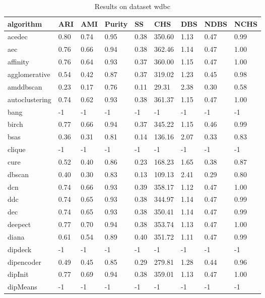 \begin{table}[H]
\centering
\caption{Results on dataset wdbc}
\label{tab:params:wdbc}
\begin{tabular}{|l|l|l|l|l|l|l|l|l|}
\hline
algorithm & ARI & AMI & Purity & SS & CHS & DBS & NDBS & NCHS \\
\hline
acedec & 0.80 & 0.74 & 0.95 & 0.38 & 350.60 & 1.13 & 0.47 & 0.99 \\
\hline
aec & 0.76 & 0.66 & 0.94 & 0.38 & 362.46 & 1.14 & 0.47 & 1.00 \\
\hline
affinity & 0.76 & 0.64 & 0.93 & 0.37 & 360.00 & 1.15 & 0.47 & 1.00 \\
\hline
agglomerative & 0.54 & 0.42 & 0.87 & 0.37 & 319.02 & 1.23 & 0.45 & 0.98 \\
\hline
amddbscan & 0.23 & 0.17 & 0.76 & 0.11 & 29.31 & 2.38 & 0.30 & 0.58 \\
\hline
autoclustering & 0.74 & 0.62 & 0.93 & 0.38 & 361.37 & 1.15 & 0.47 & 1.00 \\
\hline
bang & -1 & -1 & -1 & -1 & -1 & -1 & -1 & -1 \\
\hline
birch & 0.77 & 0.66 & 0.94 & 0.37 & 345.22 & 1.15 & 0.46 & 0.99 \\
\hline
bsas & 0.36 & 0.31 & 0.81 & 0.14 & 136.16 & 2.07 & 0.33 & 0.83 \\
\hline
clique & -1 & -1 & -1 & -1 & -1 & -1 & -1 & -1 \\
\hline
cure & 0.52 & 0.40 & 0.86 & 0.23 & 168.23 & 1.65 & 0.38 & 0.87 \\
\hline
dbscan & 0.40 & 0.30 & 0.83 & 0.13 & 109.13 & 2.41 & 0.29 & 0.80 \\
\hline
dcn & 0.74 & 0.66 & 0.93 & 0.39 & 358.17 & 1.12 & 0.47 & 1.00 \\
\hline
ddc & 0.74 & 0.65 & 0.93 & 0.38 & 344.97 & 1.14 & 0.47 & 0.99 \\
\hline
dec & 0.74 & 0.65 & 0.93 & 0.38 & 350.41 & 1.14 & 0.47 & 0.99 \\
\hline
deepect & 0.77 & 0.70 & 0.94 & 0.38 & 353.74 & 1.13 & 0.47 & 1.00 \\
\hline
diana & 0.61 & 0.54 & 0.89 & 0.40 & 351.72 & 1.11 & 0.47 & 0.99 \\
\hline
dipdeck & -1 & -1 & -1 & -1 & -1 & -1 & -1 & -1 \\
\hline
dipencoder & 0.49 & 0.45 & 0.85 & 0.29 & 279.81 & 1.28 & 0.44 & 0.96 \\
\hline
dipInit & 0.77 & 0.69 & 0.94 & 0.38 & 359.01 & 1.13 & 0.47 & 1.00 \\
\hline
dipMeans & -1 & -1 & -1 & -1 & -1 & -1 & -1 & -1 \\

\end{tabular}
\end{table}
